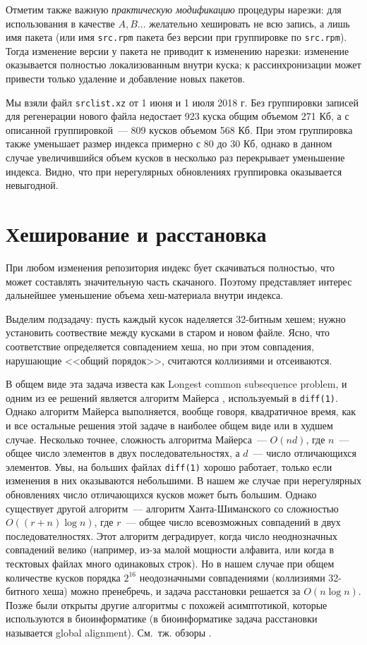 \documentclass[russian,a4paper,12pt]{article}
\begin{document}
Отметим также важную \textit{практическую модификацию} процедуры нарезки: для использования в качестве $A, B\ldots$
желательно хешировать не всю запись, а лишь имя пакета (или имя \verb|src.rpm| пакета без версии при группировке по \verb|src.rpm|).
Тогда изменение версии у пакета не приводит к изменению нарезки: изменение оказывается полностью локализованным внутри куска;
к рассинхронизации может привести только удаление и добавление новых пакетов.

Мы взяли файл \verb|srclist.xz| от 1 июня и 1 июля 2018 г.  Без группировки записей для регенерации нового файла
недостает 923 куска общим объемом 271 Кб, а с описанной группировкой~--- 809 кусков объемом 568 Кб.  При этом группировка
также уменьшает размер индекса примерно с 80 до 30 Кб, однако в данном случае увеличившийся объем кусков в несколько
раз перекрывает уменьшение индекса.  Видно, что при нерегулярных обновлениях группировка оказывается невыгодной.

\section{Хеширование и расстановка}
При любом изменения репозитория индекс бует скачиваться полностью, что может составлять значительную часть скачаного.
Поэтому представляет интерес дальнейшее уменьшение объема хеш-материала внутри индекса.

Выделим подзадачу: пусть каждый кусок наделяется 32-битным хешем; нужно установить соотвествие между кусками в старом
и новом файле.  Ясно, что соответствие определяется совпадением хеша, но при этом совпадения, нарушающие <<общий порядок>>,
считаются коллизиями и отсеиваются.

В общем виде эта задача известа как Longest common subsequence problem, и одним из ее решений является алгоритм Майерса
\cite{myers}, используемый в \verb|diff(1)|.  Однако алгоритм Майерса выполняется, вообще говоря, квадратичное время,
как и все остальные решения этой задаче в наиболее общем виде или в худшем случае.  Несколько точнее, сложность алгоритма Майерса~---
$O(nd)$, где $n$~--- общее число элементов в двух последовательностях, а $d$~--- число отличающихся элементов.
Увы, на больших файлах \verb|diff(1)| хорошо работает, только если изменения в них оказываются небольшими.
В нашем же случае при нерегулярных обновлениях число отличающихся кусков может быть большим.
Однако существует другой алгоритм~--- алгоритм Ханта-Шиманского со сложностью $O((r+n)\log n)$, где $r$~--- общее число
всевозможных совпадений в двух последователностях.  Этот алгоритм деградирует, когда число неоднозначных совпадений велико
(например, из-за малой мощности алфавита, или когда в тесктовых файлах много одинаковых строк).  Но в нашем случае при общем
количестве кусков порядка $2^{16}$ неодозначными совпадениями (коллизиями 32-битного хеша) можно пренебречь, и задача расстановки
решается за $O(n\log n)$.  Позже были открыты другие алгоритмы с похожей асимптотикой, которые используются в биоинформатике
\cite[с.\,291]{seq} (в биоинформатике задача расстановки называется global alignment).  См.~тж. обзоры \cite{survey,symposium}.
\end{document}
